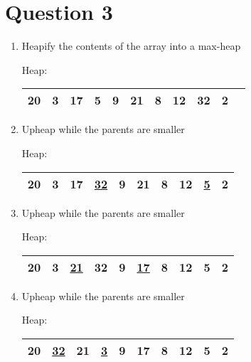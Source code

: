 \documentclass[fleqn, 12pt]{article}
\begin{document}
\newpage
\section*{Question 3}

\begin{enumerate}[Step 1:]
\item Heapify the contents of the array into a max-heap
    \begin{center}
        Heap:
        \begin{tabular}{|*{11}{c|}}
            \hline
            20 & 3 & 17 & 5 & 9 & 21 & 8 & 12 & 32 & 2\\
            \hline
        \end{tabular}
    \end{center}
    

\item Upheap while the parents are smaller
    \begin{center}
        Heap:
        \begin{tabular}{|*{10}{c|}}
            \hline
            20 & 3 & 17 & \underline{32} & 9 & 21 & 8 & 12 & \underline{5} & 2\\
            \hline
        \end{tabular}
    \end{center}
    
\item Upheap while the parents are smaller
    \begin{center}
        Heap:
        \begin{tabular}{|*{10}{c|}}
            \hline
            20 & 3 & \underline{21} & 32 & 9 & \underline{17} & 8 & 12 & 5 & 2\\
            \hline
        \end{tabular}
    \end{center}

\item Upheap while the parents are smaller
    \begin{center}
        Heap:
        \begin{tabular}{|*{10}{c|}}
            \hline
            20 & \underline{32} & 21 & \underline{3} & 9 & 17 & 8 & 12 & 5 & 2\\
            \hline
        \end{tabular}
    \end{center}
    

\end{enumerate}
\end{document}
